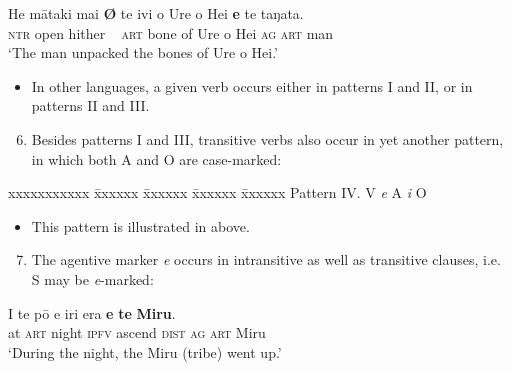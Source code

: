 \ea\label{ex:8.6}
\gll He mātaki mai  \textbf{\textup{Ø}} te ivi o Ure o Hei \textbf{e} te taŋata.\\
\textsc{ntr} open hither ~ \textsc{art} bone of Ure o Hei \textsc{ag} \textsc{art} man\\

\glt
‘The man unpacked the bones of Ure o Hei.’ \textstyleExampleref{[Blx-2-01.028]}
\z
\begin{itemize}
\item[]
In other languages, a given verb occurs either in patterns I and II, or in patterns II and III.
\end{itemize}

\begin{enumerate}
\setcounter{enumi}{5}

\item 
Besides patterns I and III, transitive verbs also occur in yet another pattern, in which both A and O are case-marked:
\end{enumerate}

\ea\label{ex:8.1d}
\begin{tabbing}
xxxxxxxxxxx \= xxxxxx \= xxxxxx \=  xxxxxx \= xxxxxx \kill
Pattern IV. \> V \> \textit{e} A \> \textit{i} O
\end{tabbing}
\z

\begin{itemize}
\item[]
This pattern is illustrated in  above. 
\end{itemize}

\begin{enumerate}
\setcounter{enumi}{6}
\item 
The agentive marker \textit{e} occurs in intransitive as well as transitive clauses, i.e. S may be \textit{e}{}-marked:
\end{enumerate}

\ea\label{ex:8.7}
\gll {\ꞌ}I te pō e iri era \textbf{e} \textbf{te} \textbf{Miru}.\\
at \textsc{art} night \textsc{ipfv} ascend \textsc{dist} \textsc{ag} \textsc{art} Miru\\

\glt 
‘During the night, the Miru (tribe) went up.’ \textstyleExampleref{[R304.050]} 
\z

